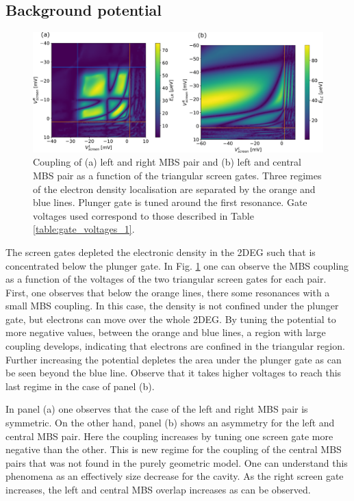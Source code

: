 \subsection{Background potential}

\begin{figure}
\centering
  \includegraphics[width=\linewidth]{figures/device_1_screens.pdf}
  \caption{Coupling of (a) left and right MBS pair and (b) left and central MBS pair as a function of the triangular screen gates. Three regimes of the electron density localisation are separated by the orange and blue lines. Plunger gate is tuned around the first resonance. Gate voltages used correspond to those described in Table \ref{table:gate_voltages_1}.}
  \label{fig:device_1_screens}
\end{figure}

The screen gates depleted the electronic density in the 2DEG such that is concentrated below the plunger gate.
In Fig. \ref{fig:device_1_screens} one can observe the MBS coupling as a function of the voltages of the two triangular screen gates for each pair.
First, one observes that below the orange lines, there some resonances with a small MBS coupling.
In this case, the density is not confined under the plunger gate, but electrons can move over the whole 2DEG.
By tuning the potential to more negative values, between the orange and blue lines, a region with large coupling develops, indicating that electrons are confined in the triangular region.
Further increasing the potential depletes the area under the plunger gate as can be seen beyond the blue line.
Observe that it takes higher voltages to reach this last regime in the case of panel (b).

In panel (a) one observes that the case of the left and right MBS pair is symmetric.
On the other hand, panel (b) shows an asymmetry for the left and central MBS pair.
Here the coupling increases by tuning one screen gate more negative than the other.
This is new regime for the coupling of the central MBS pairs that was not found in the purely geometric model.
One can understand this phenomena as an effectively size decrease for the cavity.
As the right screen gate increases, the left and central MBS overlap increases as can be observed.

